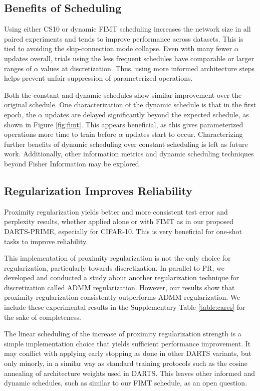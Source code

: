 \documentclass[letterpaper]{article} \usepackage{aaai22}  \usepackage{times}  \usepackage{helvet}  \usepackage{courier}  \usepackage[hyphens]{url}  \usepackage{graphicx} \urlstyle{rm} \def\UrlFont{\rm}  \usepackage{natbib}  \usepackage{caption} \DeclareCaptionStyle{ruled}{labelfont=normalfont,labelsep=colon,strut=off} \frenchspacing  \setlength{\pdfpagewidth}{8.5in}  \setlength{\pdfpageheight}{11in}  \usepackage{algorithm}
\begin{document}
\subsection{Benefits of Scheduling}
Using either CS10 or dynamic FIMT scheduling increases the network size in all paired experiments and tends to improve performance across datasets. This is tied to avoiding the skip-connection mode collapse. Even with many fewer $\alpha$ updates overall, trials using the less frequent schedules have comparable or larger ranges of $\alpha$ values at discretization. Thus, using more informed architecture steps helps prevent unfair suppression of parameterized operations.

Both the constant and dynamic schedules show similar improvement over the original schedule. One characterization of the dynamic schedule is that in the first epoch, the $\alpha$ updates are delayed significantly beyond the expected schedule, as shown in Figure \ref{fig:fimt}. This appears beneficial, as this gives parameterized operations more time to train before $\alpha$ updates start to occur. Characterizing further benefits of dynamic scheduling over constant scheduling is left as future work. Additionally, other information metrics and dynamic scheduling techniques beyond Fisher Information may be explored. 

\subsection{Regularization Improves Reliability}
Proximity regularization yields better and more consistent test error and perplexity results, whether applied alone or with FIMT as in our proposed DARTS-PRIME, especially for CIFAR-10. This is very beneficial for one-shot tasks to improve reliability. 

This implementation of proximity regularization is not the only choice for regularization, particularly towards discretization. In parallel to PR, we developed and conducted a study about another regularization technique for discretization called ADMM regularization. However, our results show that proximity regularization consistently outperforms ADMM regularization. We include these experimental results in the Supplementary Table \ref{table:cares} for the sake of completeness.

The linear scheduling of the increase of proximity regularization strength is a simple implementation choice that yields sufficient performance improvement. It may conflict with applying early stopping as done in other DARTS variants, but only minorly, in a similar way as standard training protocols such as the cosine annealing of architecture weights used in DARTS. This leaves other informed and dynamic schedules, such as similar to our FIMT schedule, as an open question.
\end{document}
